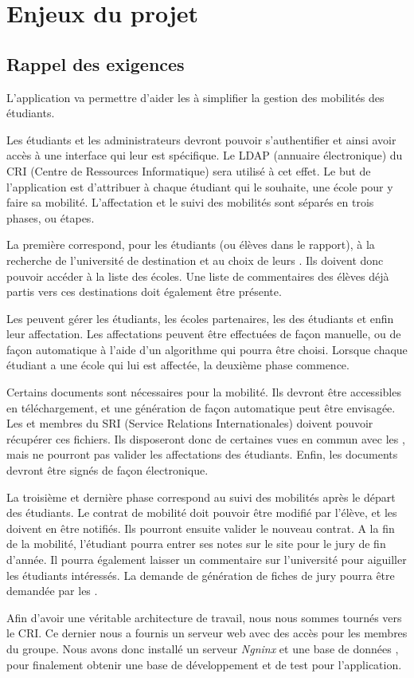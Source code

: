 \chapter{Enjeux du projet}


\section{Rappel des exigences}

L'application va permettre d'aider les \ris à simplifier la gestion des mobilités des étudiants. 

\bigbreak

Les étudiants et les administrateurs devront pouvoir s'authentifier et ainsi avoir accès à une interface qui leur est spécifique. Le LDAP (annuaire électronique) du CRI (Centre de Ressources Informatique) sera utilisé à cet effet. Le but de l'application est d'attribuer à chaque étudiant qui le souhaite, une école pour y faire sa mobilité. L'affectation et le suivi des mobilités sont séparés en trois phases, ou étapes. 


\bigbreak

La première correspond, pour les étudiants (ou élèves dans le rapport), à la recherche de l'université de destination et au choix de leurs \voe. Ils doivent donc pouvoir accéder à la liste des écoles. Une liste de commentaires des élèves déjà partis vers ces destinations doit également être présente.

Les \ris peuvent gérer les étudiants, les écoles partenaires, les \voe des étudiants et enfin leur affectation. Les affectations peuvent être effectuées de façon manuelle, ou de façon automatique à l'aide d'un algorithme qui pourra être choisi. Lorsque chaque étudiant a une école qui lui est affectée, la deuxième phase commence.
\bigbreak

Certains documents sont nécessaires pour la mobilité. Ils devront être accessibles en téléchargement, et une génération de façon automatique peut être envisagée. Les \ris et membres du SRI (Service Relations Internationales) doivent pouvoir récupérer ces fichiers. Ils disposeront donc de certaines vues en commun avec les \ris, mais ne pourront pas valider les affectations des étudiants. Enfin, les documents devront être signés de façon électronique.

\bigbreak

La troisième et dernière phase correspond au suivi des mobilités après le départ des étudiants. Le contrat de mobilité doit pouvoir être modifié par l'élève, et les \ris doivent en être notifiés. Ils pourront ensuite valider le nouveau contrat. A la fin de la mobilité, l'étudiant pourra entrer ses notes sur le site pour le jury de fin d'année. Il pourra également laisser un commentaire sur l'université pour aiguiller les étudiants intéressés. La demande de génération de fiches de jury pourra être demandée par les \ris.


\bigbreak

Afin d'avoir une véritable architecture de travail, nous nous sommes tournés vers le CRI. Ce dernier nous a fournis un serveur web avec des accès pour les membres du groupe. Nous avons donc installé un serveur \textit{Ngninx} et une base de données \mdb, pour finalement obtenir une base de développement et de test pour l'application.
